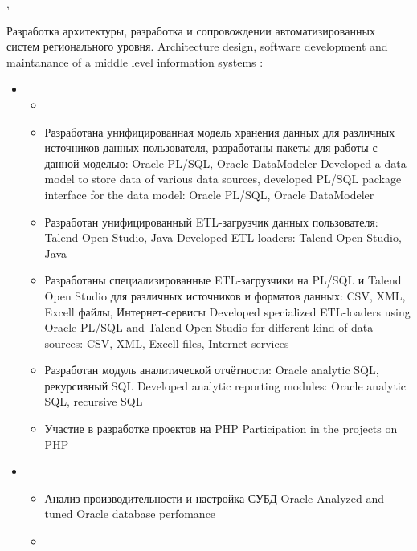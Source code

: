 \documentclass[11pt,a4paper,sans, russian]{moderncv}        %
\begin{document}
{\protect{}}
{\cityperm, \country}
{}
{
	{Разработка архитектуры, разработка и сопровождении автоматизированных систем регионального уровня.}
	{Architecture design, software development and maintanance of a middle level information systems}
  \newline{}
	\achievements:
	\begin{itemize}
	\item {}
		\begin{itemize}
			\item {}
			\item {}
				{Разработана унифицированная модель хранения данных для различных источников данных пользователя, разработаны пакеты для работы с данной моделью: Oracle PL/SQL, Oracle DataModeler}
				{Developed a data model to store data of various data sources, developed PL/SQL package interface for the data model: Oracle PL/SQL, Oracle DataModeler}
			\item {}
				{Разработан унифицированный ETL-загрузчик данных пользователя: Talend Open Studio, Java}
				{Developed ETL-loaders: Talend Open Studio, Java}
			\item {}
				{Разработаны специализированные ETL-загрузчики на PL/SQL и Talend Open Studio для различных источников и форматов данных: CSV, XML, Excell файлы, Интернет-сервисы}
				{Developed specialized ETL-loaders using Oracle PL/SQL and Talend Open Studio for different kind of data sources: CSV, XML, Excell files, Internet services}
			\item {}
				{Разработан модуль аналитической отчётности: Oracle analytic SQL, рекурсивный SQL}		
				{Developed analytic reporting modules: Oracle analytic SQL, recursive SQL}
			\item {}
				{Участие в разработке проектов на PHP}
				{Participation in the projects on PHP}
		\end{itemize}
	\item {}
		\begin{itemize}
			\item {}
				{Анализ производительности и настройка СУБД Oracle}
				{Analyzed and tuned Oracle database perfomance}
			\item {}

\end{itemize}
\end{itemize}}
\end{document}
